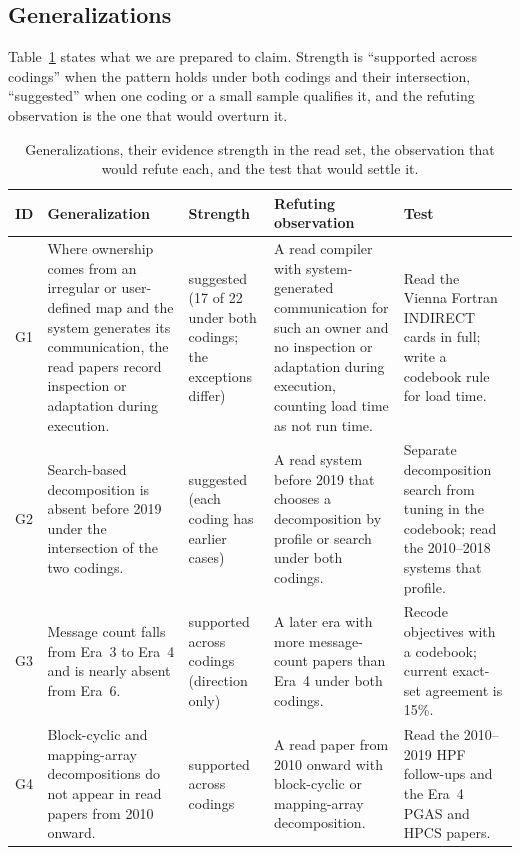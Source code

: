 \subsection{Generalizations}
Table~\ref{tab:generalizations} states what we are prepared to claim. Strength is ``supported across codings'' when the pattern holds under both codings and their intersection, ``suggested'' when one coding or a small sample qualifies it, and the refuting observation is the one that would overturn it.

\begin{table}[t]
\centering
\scriptsize
\caption{Generalizations, their evidence strength in the read set, the observation that would refute each, and the test that would settle it.}
\label{tab:generalizations}
\begin{tabular}{p{}p{}p{}p{}p{}}
\toprule
ID & Generalization & Strength & Refuting observation & Test \\
\midrule
G1 & Where ownership comes from an irregular or user-defined map and the system generates its communication, the read papers record inspection or adaptation during execution. & suggested (17 of 22 under both codings; the exceptions differ) & A read compiler with system-generated communication for such an owner and no inspection or adaptation during execution, counting load time as not run time. & Read the Vienna Fortran INDIRECT cards in full; write a codebook rule for load time. \\
G2 & Search-based decomposition is absent before 2019 under the intersection of the two codings. & suggested (each coding has earlier cases) & A read system before 2019 that chooses a decomposition by profile or search under both codings. & Separate decomposition search from tuning in the codebook; read the 2010--2018 systems that profile. \\
G3 & Message count falls from Era~3 to Era~4 and is nearly absent from Era~6. & supported across codings (direction only) & A later era with more message-count papers than Era~4 under both codings. & Recode objectives with a codebook; current exact-set agreement is 15\%. \\
G4 & Block-cyclic and mapping-array decompositions do not appear in read papers from 2010 onward. & supported across codings & A read paper from 2010 onward with block-cyclic or mapping-array decomposition. & Read the 2010--2019 HPF follow-ups and the Era~4 PGAS and HPCS papers. \\

\end{tabular}
\end{table}
